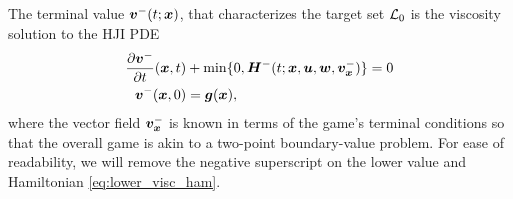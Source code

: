  The terminal value $\bm{v}^- {(t; \bm{x})}$, that characterizes the target set $\mathcal{L}_0$ is the viscosity solution to the HJI PDE
 \begin{subequations}
 	\begin{align}
 	\frac{\partial \bm{v}^-}{\partial t}{(\bm{x}, t)} & + \min \{0, \bm{H}^- (t; \bm{x}, \bm{u}, \bm{w},\bm{v}^-_{\bm{x}}) \} = 0 \\
 	\bm{v}^-(\bm{x},0) &= \bm{g}(\bm{x}),
 	\end{align}
 	\label{eq:lower_hji_pde}
 \end{subequations}
 \noindent where the vector field $\bm{v}^-_{\bm{x}}$ is known in terms of the game's terminal conditions so that the overall game is akin to a two-point boundary-value problem. For ease of readability, we will remove the negative superscript on the lower value and Hamiltonian \eqref{eq:lower_visc_ham}. 
 